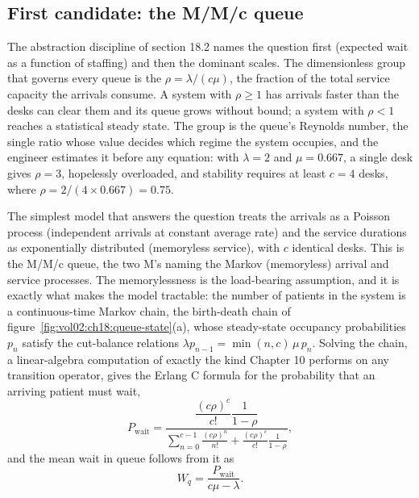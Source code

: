 \subsection{First candidate: the M/M/c queue}

The abstraction discipline of section 18.2 names the question first
(expected wait as a function of staffing) and then the dominant scales.
The dimensionless group that governs every queue is the
 $\rho = \lambda/(c\mu)$, the fraction of the total
service capacity the arrivals consume. A system with $\rho \ge 1$ has
arrivals faster than the desks can clear them and its queue grows without
bound; a system with $\rho < 1$ reaches a statistical steady state. The
group is the queue's Reynolds number, the single ratio whose value
decides which regime the system occupies, and the engineer estimates it
before any equation: with $\lambda = 2$ and $\mu = 0.667$, a single desk
gives $\rho = 3$, hopelessly overloaded, and stability requires at least
$c = 4$ desks, where $\rho = 2/(4 \times 0.667) = 0.75$.

The simplest model that answers the question treats the arrivals as a
Poisson process (independent arrivals at constant average rate) and the
service durations as exponentially distributed (memoryless service), with
$c$ identical desks. This is the M/M/c queue, the two M's naming the
Markov (memoryless) arrival and service processes. The memorylessness is
the load-bearing assumption, and it is exactly what makes the model
tractable: the number of patients in the system is a continuous-time
Markov chain, the birth-death chain of
figure~\ref{fig:vol02:ch18:queue-state}(a), whose steady-state occupancy
probabilities $p_n$ satisfy the cut-balance relations $\lambda p_{n-1} =
\min(n, c)\,\mu\, p_n$. Solving the chain, a linear-algebra computation of
exactly the kind Chapter 10 performs on any transition operator, gives the
Erlang C formula for the probability that an arriving patient must wait,
\[
P_{\text{wait}}
  = \frac{\dfrac{(c\rho)^c}{c!}\dfrac{1}{1-\rho}}
         {\displaystyle\sum_{n=0}^{c-1}\frac{(c\rho)^n}{n!}
          + \frac{(c\rho)^c}{c!}\frac{1}{1-\rho}},
\]
and the mean wait in queue follows from it as
\[
W_q = \frac{P_{\text{wait}}}{c\mu - \lambda}.
\]



